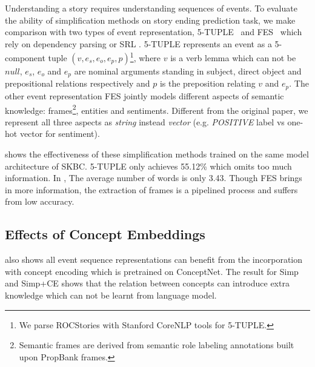 Understanding a story requires understanding sequences of events. 
To evaluate the ability of 
simplification methods on story ending prediction task, we make comparison with
 two types of event representation, 5-TUPLE~\cite{pichotta2016learning} and FES~\cite{peng2017joint}
  which rely on dependency parsing or SRL . 
  5-TUPLE represents an event as a 5-component tuple $(v, e_s, e_o, e_p, p)
  $\footnote{We  parse ROCStories with Stanford CoreNLP tools for 5-TUPLE.}, 
  where $v$ is a verb lemma which can not be $null$, $e_s$, $e_o$ and $e_p$ are nominal 
  arguments standing in subject, direct object and prepositional 
  relations respectively and $p$ is the preposition relating $v$ and $e_p$. 
The other event representation FES jointly models different aspects of 
semantic knowledge: frames\footnote{Semantic frames 
are derived from semantic role labeling annotations built upon PropBank frames. }, 
entities and sentiments. 
Different from the original paper, we represent all three aspects 
as \textit{string} instead \textit{vector} (e.g. \textit{POSITIVE} 
label vs one-hot vector for sentiment).

 shows the effectiveness of these simplification methods trained 
on the same model architecture of SKBC. 5-TUPLE only 
achieves 55.12\% which omits too much information. In , 
The average number of words is only 3.43. Though FES brings in more information, 
the extraction of  frames is a pipelined process and suffers from low accuracy.
\subsection{Effects of Concept Embeddings}
\label{sec:ce}
 also shows all event sequence representations can benefit from 
the incorporation with  concept encoding which is pretrained on ConceptNet. 
The result for Simp and Simp+CE shows that the relation between concepts can introduce extra 
knowledge which can not 
be learnt from language model.

